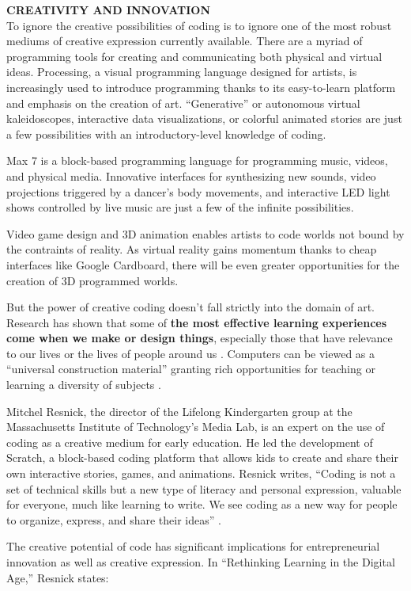 \textbf{CREATIVITY AND INNOVATION} \\
To ignore the creative possibilities of coding is to ignore one of the most robust mediums of creative expression currently available. There are a myriad of programming tools for creating and communicating both physical and virtual ideas. Processing, a visual programming language designed for artists, is increasingly used to introduce programming thanks to its easy-to-learn platform and emphasis on the creation of art. ``Generative'' or autonomous virtual kaleidoscopes, interactive data visualizations, or colorful animated stories are just a few possibilities with an introductory-level knowledge of coding. \par
Max 7 is a block-based programming language for programming music, videos, and physical media. Innovative interfaces for synthesizing new sounds, video projections triggered by a dancer's body movements, and interactive LED light shows controlled by live music are just a few of the infinite possibilities. \par
Video game design and 3D animation enables artists to code worlds not bound by the contraints of reality. As virtual reality gains momentum thanks to cheap interfaces like Google Cardboard, there will be even greater opportunities for the creation of 3D programmed worlds. \par  
But the power of creative coding doesn't fall strictly into the domain of art. Research has shown that some of \textbf{the most effective learning experiences come when we make or design things}, especially those that have relevance to our lives or the lives of people around us \cite{papert1}. Computers can be viewed as a ``universal construction material'' granting rich opportunities for teaching or learning a diversity of subjects \cite{res98}. \par
Mitchel Resnick, the director of the Lifelong Kindergarten group at the Massachusetts Institute of Technology's Media Lab, is an expert on the use of coding as a creative medium for early education. He led the development of Scratch, a block-based coding platform that allows kids to create and share their own interactive stories, games, and animations. Resnick writes, ``Coding is not a set of technical skills but a new type of literacy and personal expression, valuable for everyone, much like learning to write. We see coding as a new way for people to organize, express, and share their ideas'' \cite{resonline}. \par
The creative potential of code has significant implications for entrepreneurial innovation as well as creative expression. In ``Rethinking Learning in the Digital Age,'' Resnick states:
